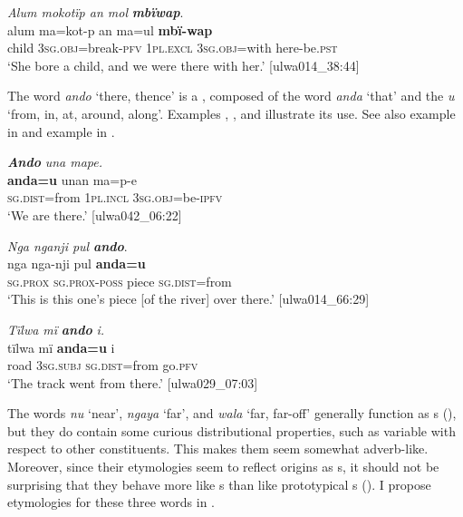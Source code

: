 \ea%
    \label{ex:otherwc:92}
          \textit{Alum mokotïp an mol} \textbf{\textit{mbïwap}}.\\
\gll alum  ma=kot-p        an      ma=ul      \textbf{mbï-wap}\\
    child  3\textsc{sg.obj}=break-\textsc{pfv}  1\textsc{pl.excl}  3\textsc{sg.obj}=with  here-be.\textsc{pst}\\
\glt `She bore a child, and we were there with her.’ [ulwa014\_38:44]
\z

The  word \textit{ando} ‘there, thence’ is a , composed of the  word \textit{anda} ‘that’ and the  \textit{u} ‘from, in, at, around, along’. Examples , , and  illustrate its use. See also example  in  and example  in .

\ea%
    \label{ex:otherwc:93}
          \textbf{\textit{Ando}} \textit{una mape.}\\
\gll    \textbf{anda=u}    unan    ma=p-e\\
    \textsc{sg.dist}=from  \textsc{1pl.incl}  3\textsc{sg.obj}=be\textsc{{}-ipfv}\\
\glt `We are there.’ [ulwa042\_06:22]
\z

\ea%
    \label{ex:otherwc:94}
          \textit{Nga nganji pul} \textbf{\textit{ando}}.\\
\gll nga      nga-nji      pul    \textbf{anda=u}\\
    \textsc{sg.prox}  \textsc{sg.prox-poss}  piece  \textsc{sg.dist}=from\\
\glt `This is this one’s piece [of the river] over there.’ [ulwa014\_66:29]
\z

\ea%
    \label{ex:otherwc:95}
          \textit{Tïlwa mï} \textbf{\textit{ando}} \textit{i.}\\
\gll    tïlwa  mï      \textbf{anda=u}    i\\
    road  3\textsc{sg.subj}  \textsc{sg.dist}=from  go.\textsc{pfv}\\
\glt `The track went from there.’ [ulwa029\_07:03]
\z

The  words \textit{nu} ‘near’, \textit{ngaya} ‘far’, and \textit{wala} ‘far, far-off’ generally function as s (), but they do contain some curious distributional properties, such as variable  with respect to other constituents. This makes them seem somewhat adverb-like. Moreover, since their etymologies seem to reflect origins as s, it should not be surprising that they behave more like s than like prototypical s (). I propose \mbox{etymologies} for these three words in .

